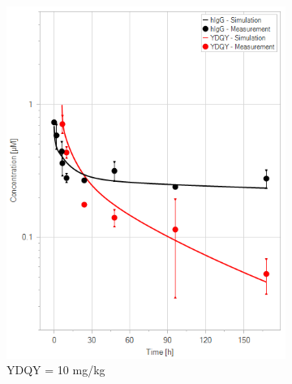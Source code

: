 \documentclass[fleqn,10pt]{physiome}
\begin{document}
\begin{figure}[htb]
\begin{subfigure}{0.32\textwidth}
        \includegraphics[width=\textwidth]{pl12.png}
        \caption{YDQY = 10 mg/kg}
        \label{fig:7b}
    \end{subfigure}
    \hfill
    \begin{subfigure}{0.32\textwidth}

\end{subfigure}
\end{figure}
\end{document}
